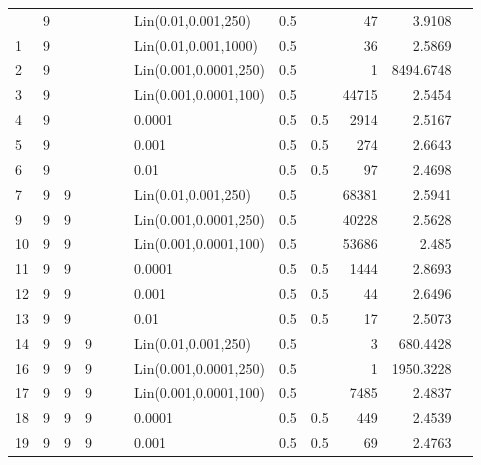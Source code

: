 \begin{longtable}{lrrrrrlrrrrr}
\bottomrule
\endlastfoot
    0 &       9 &   &   &   &   &   Lin(0.01,0.001,250) &  0.5 &        &      47 &                 3.9108 \\
    1 &       9 &   &   &   &   &  Lin(0.01,0.001,1000) &  0.5 &        &      36 &                 2.5869 \\
    2 &       9 &   &   &   &   & Lin(0.001,0.0001,250) &  0.5 &        &       1 &              8494.6748 \\
    3 &       9 &   &   &   &   & Lin(0.001,0.0001,100) &  0.5 &        &   44715 &                 2.5454 \\
    4 &       9 &   &   &   &   &                0.0001 &  0.5 &    0.5 &    2914 &                 2.5167 \\
    5 &       9 &   &   &   &   &                 0.001 &  0.5 &    0.5 &     274 &                 2.6643 \\
    6 &       9 &   &   &   &   &                  0.01 &  0.5 &    0.5 &      97 &                 2.4698 \\
    7 &       9 & 9 &   &   &   &   Lin(0.01,0.001,250) &  0.5 &        &   68381 &                 2.5941 \\
    9 &       9 & 9 &   &   &   & Lin(0.001,0.0001,250) &  0.5 &        &   40228 &                 2.5628 \\
   10 &       9 & 9 &   &   &   & Lin(0.001,0.0001,100) &  0.5 &        &   53686 &                  2.485 \\
   11 &       9 & 9 &   &   &   &                0.0001 &  0.5 &    0.5 &    1444 &                 2.8693 \\
   12 &       9 & 9 &   &   &   &                 0.001 &  0.5 &    0.5 &      44 &                 2.6496 \\
   13 &       9 & 9 &   &   &   &                  0.01 &  0.5 &    0.5 &      17 &                 2.5073 \\
   14 &       9 & 9 & 9 &   &   &   Lin(0.01,0.001,250) &  0.5 &        &       3 &               680.4428 \\
   16 &       9 & 9 & 9 &   &   & Lin(0.001,0.0001,250) &  0.5 &        &       1 &              1950.3228 \\
   17 &       9 & 9 & 9 &   &   & Lin(0.001,0.0001,100) &  0.5 &        &    7485 &                 2.4837 \\
   18 &       9 & 9 & 9 &   &   &                0.0001 &  0.5 &    0.5 &     449 &                 2.4539 \\
   19 &       9 & 9 & 9 &   &   &                 0.001 &  0.5 &    0.5 &      69 &                 2.4763 \\

\end{longtable}
